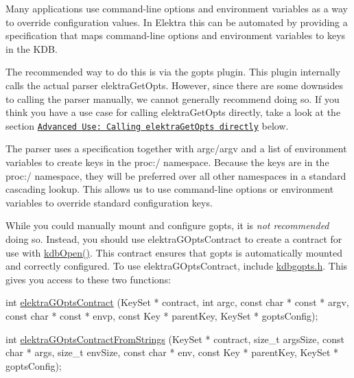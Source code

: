 Many applications use command-\/line options and environment variables as a way to override configuration values. In Elektra this can be automated by providing a specification that maps command-\/line options and environment variables to keys in the K\+DB.

The recommended way to do this is via the {\ttfamily gopts} plugin. This plugin internally calls the actual parser {\ttfamily elektra\+Get\+Opts}. However, since there are some downsides to calling the parser manually, we cannot generally recommend doing so. If you think you have a use case for calling {\ttfamily elektra\+Get\+Opts} directly, take a look at the section \href{#elektra-opts}{\tt Advanced Use\+: Calling {\ttfamily elektra\+Get\+Opts} directly} below.

The parser uses a specification together with {\ttfamily argc}/{\ttfamily argv} and a list of environment variables to create keys in the {\ttfamily proc\+:/} namespace. Because the keys are in the {\ttfamily proc\+:/} namespace, they will be preferred over all other namespaces in a standard cascading lookup. This allows us to use command-\/line options or environment variables to override standard configuration keys.

While you could manually mount and configure {\ttfamily gopts}, it is {\itshape not recommended} doing so. Instead, you should use {\ttfamily elektra\+G\+Opts\+Contract} to create a contract for use with {\ttfamily \hyperlink{group__kdb_ga844e1299a84c3fbf1d3a905c5c893ba5}{kdb\+Open()}}. This contract ensures that {\ttfamily gopts} is automatically mounted and correctly configured. To use {\ttfamily elektra\+G\+Opts\+Contract}, include {\ttfamily \hyperlink{kdbgopts_8h}{kdbgopts.\+h}}. This gives you access to these two functions\+:


\begin{DoxyCode}
\textcolor{keywordtype}{int} \hyperlink{contracts_8c_af4f606fc2179e917a10c77dab576d648}{elektraGOptsContract} (KeySet * contract, \textcolor{keywordtype}{int} argc, \textcolor{keyword}{const} \textcolor{keywordtype}{char} * \textcolor{keyword}{const} * argv, \textcolor{keyword}{const}
       \textcolor{keywordtype}{char} * \textcolor{keyword}{const} * envp, \textcolor{keyword}{const} Key * parentKey, KeySet * goptsConfig);

\textcolor{keywordtype}{int} \hyperlink{contracts_8c_ade81f23438c00b284247955e8b4b207d}{elektraGOptsContractFromStrings} (KeySet * contract, \textcolor{keywordtype}{size\_t} argsSize, \textcolor{keyword}{
      const} \textcolor{keywordtype}{char} * args, \textcolor{keywordtype}{size\_t} envSize, \textcolor{keyword}{const} \textcolor{keywordtype}{char} * env, \textcolor{keyword}{const} Key * parentKey, KeySet * goptsConfig);
\end{DoxyCode}


